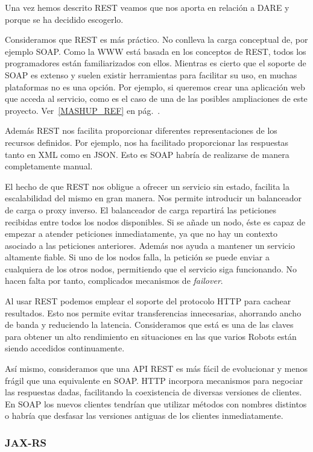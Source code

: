 Una vez hemos descrito REST veamos que nos aporta en relación a DARE y
porque se ha decidido escogerlo.

Consideramos que REST es más práctico. No conlleva la carga conceptual
de, por ejemplo SOAP\cite{SOAP}. Como la WWW está basada en los
conceptos de REST, todos los programadores están familiarizados con
ellos. Mientras es cierto que el soporte de SOAP es extenso y suelen
existir herramientas para facilitar su uso, en muchas plataformas no
es una opción. Por ejemplo, si queremos crear una aplicación web que
acceda al servicio, como es el caso de una de las posibles
ampliaciones de este proyecto. Ver~\ref{MASHUP_REF} en
pág.~\pageref{MASHUP_REF}.

Además REST nos facilita proporcionar diferentes representaciones de
los recursos definidos. Por ejemplo, nos ha facilitado proporcionar
las respuestas tanto en XML como en JSON. Esto es SOAP habría de
realizarse de manera completamente manual.

El hecho de que REST nos obligue a ofrecer un servicio sin estado,
facilita la escalabilidad del mismo en gran manera. Nos permite
introducir un balanceador de carga o proxy inverso. El balanceador de
carga repartirá las peticiones recibidas entre todos los nodos
disponibles. Si se añade un nodo, éste es capaz de empezar a atender
peticiones inmediatamente, ya que no hay un contexto asociado a las
peticiones anteriores. Además nos ayuda a mantener un servicio
altamente fiable. Si uno de los nodos falla, la petición se puede
enviar a cualquiera de los otros nodos, permitiendo que el servicio
siga funcionando. No hacen falta por tanto, complicados mecanismos de
\emph{failover}.

Al usar REST podemos emplear el soporte del protocolo HTTP para
cachear resultados. Esto nos permite evitar transferencias
innecesarias, ahorrando ancho de banda y reduciendo la
latencia. Consideramos que está es una de las claves para obtener un
alto rendimiento en situaciones en las que varios Robots están siendo
accedidos continuamente.

Así mismo, consideramos que una API REST es más fácil de evolucionar y
menos frágil que una equivalente en SOAP. HTTP incorpora mecanismos
para negociar las respuestas dadas, facilitando la coexistencia de
diversas versiones de clientes. En SOAP los nuevos clientes tendrían
que utilizar métodos con nombres distintos o habría que desfasar las
versiones antiguas de los clientes inmediatamente.


\subsubsection{JAX-RS\cite{JAXRS}}


